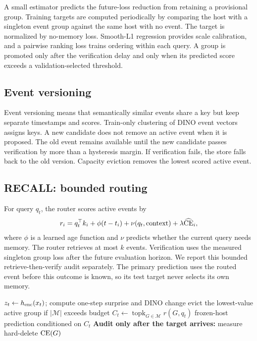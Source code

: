 A small estimator predicts the future-loss reduction from retaining a
provisional group. Training targets are computed periodically by comparing
the host with a singleton event group against the same host with no event.
The target is normalized by no-memory loss. Smooth-L1 regression provides
scale calibration, and a pairwise ranking loss trains ordering within each
query. A group is promoted only after the verification delay and only when its
predicted score exceeds a validation-selected threshold.

\subsection{Event versioning}

Event versioning means that semantically similar events share a key but keep
separate timestamps and scores. Train-only clustering of DINO event vectors
assigns keys. A new candidate does not remove an active event when it is
proposed. The old event remains available until the new candidate passes
verification by more than a hysteresis margin. If verification fails, the
store falls back to the old version. Capacity eviction removes the lowest
scored active event.

\subsection{RECALL: bounded routing}

For query $q_t$, the router scores active events by
\begin{equation}
r_i=q_t^\top k_i+\phi(t-t_i)+\nu(q_t,\mathrm{context})
+\lambda\widehat{\operatorname{CE}}_i ,
\label{eq:router}
\end{equation}
where $\phi$ is a learned age function and $\nu$ predicts whether the current
query needs memory. The router retrieves at most $k$ events. Verification
uses the measured singleton group loss after the future evaluation horizon.
We report this bounded retrieve-then-verify audit separately. The primary
prediction uses the routed event before this outcome is known, so its test
target never selects its own memory.

\begin{algorithm}[t]
\small
\caption{Online CEM with delayed verification}
\label{alg:cem}
$z_t\leftarrow h_{\rm enc}(x_t)$; compute one-step surprise and DINO change\;
evict the lowest-value active group if $|\mathcal M|$ exceeds budget\;
$C_t\leftarrow\operatorname{topk}_{G\in\mathcal M} r(G,q_t)$\;
\Return frozen-host prediction conditioned on $C_t$\;
\textbf{Audit only after the target arrives:} measure hard-delete $\operatorname{CE}(G)$\;
\end{algorithm}

